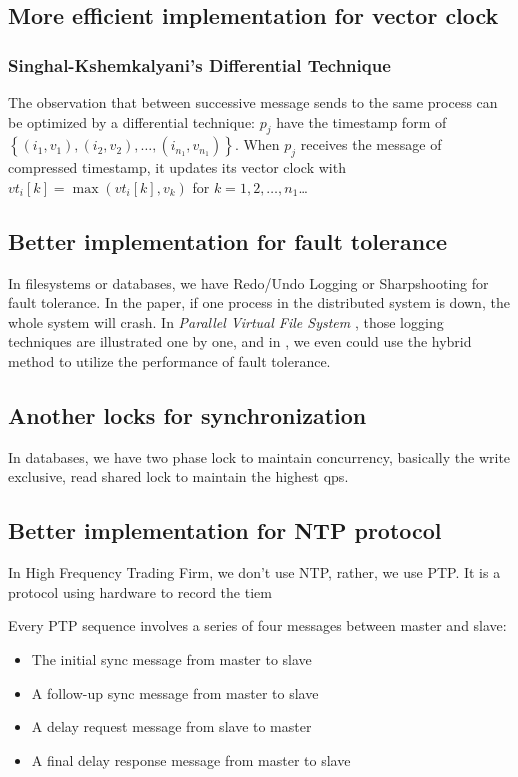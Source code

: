 \documentclass[acmlarge]{acmart}
\begin{document}
\subsection {More efficient implementation for vector clock}
\subsubsection {Singhal-Kshemkalyani’s Differential Technique}

The observation that between successive message sends to the same process can be optimized by a differential technique:
$p_j$ have the timestamp form of $\left\{\left(i_{1}, v_{1}\right),\left(i_{2}, v_{2}\right), \ldots,\left(i_{n_{1}}, v_{n_{1}}\right)\right\}$.
When $p_j$ receives the message of compressed timestamp, it updates its vector clock with $v t_{i}[k]=\max \left(v t_{i}[k], v_{k}\right)$ for $k=1,2, \ldots, n_{1}$\dots

\subsection {Better implementation for fault tolerance}
In filesystems or databases, we have Redo/Undo Logging or Sharpshooting for fault tolerance. In the paper,
if one process in the distributed system is down, the whole system will crash. In \textit{Parallel Virtual File System} \cite{carns2000pvfs}, those logging techniques are illustrated one by one,
and in \cite{choi2020libnvmmio}, we even could use the hybrid method to utilize the performance of fault tolerance.

\subsection{Another locks for synchronization}
In databases, we have two phase lock to maintain concurrency, basically the write exclusive, read shared lock to maintain the highest qps.
\subsection{Better implementation for NTP protocol}
In High Frequency Trading Firm, we don't use NTP, rather, we use PTP. It is a protocol using hardware to record the tiem
\cite{HFT-PTP-NTP} %

Every PTP sequence involves a series of four messages between master and slave:
\begin{itemize}
\item The initial sync message from master to slave
\item A follow-up sync message from master to slave
\item A delay request message from slave to master
\item A final delay response message from master to slave
\end{itemize}




\end{document}
